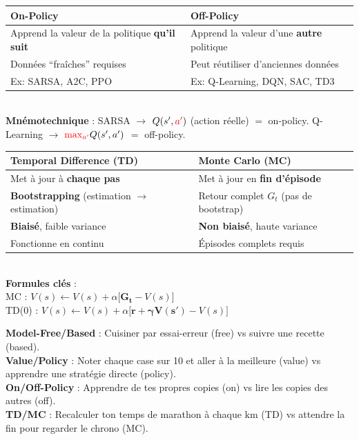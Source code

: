 \documentclass[11pt,a4paper]{article}
\begin{document}
\begin{formbox}
\renewcommand{\arraystretch}{1.2}
\begin{tabular}{@{}p{6.5cm} p{6.5cm}@{}}
\toprule
\textbf{On-Policy} & \textbf{Off-Policy} \\
\midrule
Apprend la valeur de la politique \textbf{qu'il suit} & Apprend la valeur d'une \textbf{autre} politique \\
Données ``fraîches'' requises & Peut réutiliser d'anciennes données \\
Ex: SARSA, A2C, PPO & Ex: Q-Learning, DQN, SAC, TD3 \\
\bottomrule
\end{tabular}\\[4pt]
\textbf{Mnémotechnique} : SARSA $\to$ $Q(s', \textcolor{red}{a'})$ (action réelle) $=$ on-policy. Q-Learning $\to$ $\textcolor{red}{\max_{a'}} Q(s', a')$ $=$ off-policy.
\end{formbox}

\begin{formbox}
\renewcommand{\arraystretch}{1.2}
\begin{tabular}{@{}p{6.5cm} p{6.5cm}@{}}
\toprule
\textbf{Temporal Difference (TD)} & \textbf{Monte Carlo (MC)} \\
\midrule
Met à jour à \textbf{chaque pas} & Met à jour en \textbf{fin d'épisode} \\
\textbf{Bootstrapping} (estimation $\to$ estimation) & Retour complet $G_t$ (pas de bootstrap) \\
\textbf{Biaisé}, faible variance & \textbf{Non biaisé}, haute variance \\
Fonctionne en continu & Épisodes complets requis \\
\bottomrule
\end{tabular}\\[4pt]
\textbf{Formules clés} :\\
MC : $V(s) \leftarrow V(s) + \alpha \big[\mathbf{G_t} - V(s)\big]$\\
TD(0) : $V(s) \leftarrow V(s) + \alpha \big[\mathbf{r + \gamma V(s')} - V(s)\big]$
\end{formbox}

\begin{exbox}
\textbf{Model-Free/Based} : Cuisiner par essai-erreur (free) vs suivre une recette (based).\\
\textbf{Value/Policy} : Noter chaque case sur 10 et aller à la meilleure (value) vs apprendre une stratégie directe (policy).\\
\textbf{On/Off-Policy} : Apprendre de tes propres copies (on) vs lire les copies des autres (off).\\
\textbf{TD/MC} : Recalculer ton temps de marathon à chaque km (TD) vs attendre la fin pour regarder le chrono (MC).
\end{exbox}
\end{document}
